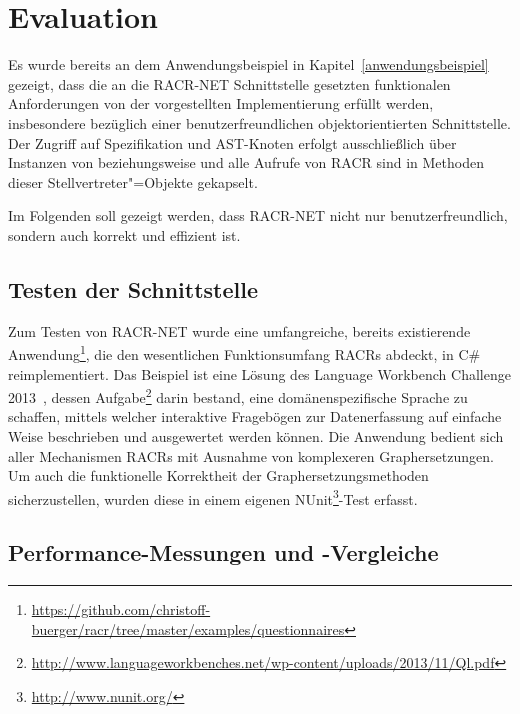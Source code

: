 

\chapter{Evaluation}\label{eval}

Es wurde bereits an dem Anwendungsbeispiel in Kapitel~\ref{anwendungsbeispiel} gezeigt, dass die an die RACR-NET Schnittstelle gesetzten funktionalen Anforderungen von der vorgestellten Implementierung erfüllt werden, insbesondere bezüglich einer benutzerfreundlichen objektorientierten Schnittstelle. Der Zugriff auf Spezifikation und AST-Knoten erfolgt ausschließlich über Instanzen von  beziehungsweise  und alle Aufrufe von RACR sind in Methoden dieser Stellvertreter"=Objekte gekapselt.

Im Folgenden soll gezeigt werden, dass RACR-NET nicht nur benutzerfreundlich, sondern auch korrekt und effizient ist.

\section{Testen der Schnittstelle}

Zum Testen von RACR-NET wurde eine umfangreiche, bereits existierende Anwendung\footnote{\url{https://github.com/christoff-buerger/racr/tree/master/examples/questionnaires}}, die den wesentlichen Funktionsumfang RACRs abdeckt, in C\# reimplementiert. Das Beispiel ist eine Lösung des Language Workbench Challenge 2013~\cite{Erdweg2013}, dessen Aufgabe\footnote{\url{http://www.languageworkbenches.net/wp-content/uploads/2013/11/Ql.pdf}} darin bestand, eine domänenspezifische Sprache zu schaffen, mittels welcher interaktive Fragebögen zur Datenerfassung auf einfache Weise beschrieben und ausgewertet werden können. Die Anwendung bedient sich aller Mechanismen RACRs mit Ausnahme von komplexeren Graphersetzungen. Um auch die funktionelle Korrektheit der Graphersetzungsmethoden sicherzustellen, wurden diese in einem eigenen NUnit\footnote{\url{http://www.nunit.org/}}-Test erfasst.

\section{Performance-Messungen und -Vergleiche}

